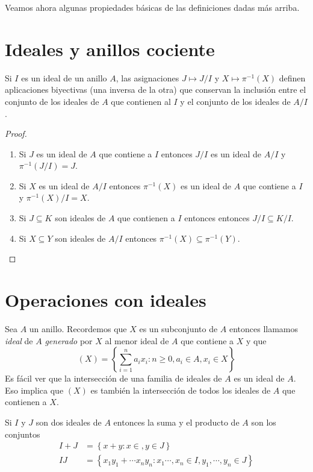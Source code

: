 Veamos ahora algunas propiedades básicas de las definiciones dadas más arriba.


\section{Ideales y anillos cociente}

\begin{teo}\label{anillos:teo:1} Si $I$ es un ideal de un anillo $A$, las asignaciones $J\mapsto J/I$ y $X\mapsto\pi^{-1}(X)$ definen aplicaciones biyectivas (una inversa de la otra) que conservan la inclusión entre el conjunto de los ideales de $A$ que contienen al $I$ y el conjunto de los ideales de $A/I$.
\end{teo}

\begin{proof} \
    \begin{enumerate}[label=(\arabic*)]
        \item Si $J$ es un ideal de $A$ que contiene a $I$ entonces $J/I$ es un ideal de $A/I$ y $\pi^{-1}(J/I)=J$.
        \item Si $X$ es un ideal de $A/I$ entonces $\pi^{-1}(X)$ es un ideal de $A$ que contiene a $I$ y $\pi^{-1}(X)/I=X$.
        \item Si $J\subseteq K$ son ideales de $A$ que contienen a $I$ entonces entonces $J/I\subseteq K/I$.
        \item Si $X\subseteq Y$ son ideales de $A/I$ entonces $\pi^{-1}(X)\subseteq\pi^{-1}(Y)$.
    \end{enumerate}
\end{proof}

\section{Operaciones con ideales}

Sea $A$ un anillo. Recordemos que $X$ es un subconjunto de $A$ entonces llamamos {\it ideal} de $A$ {\it generado} por $X$ al menor ideal de $A$ que contiene a $X$ y que 
$$(X) =\left\lbrace \sum_{i=1}^na_ix_i : n\geq 0, a_i\in A, x_i\in X \right\rbrace$$
Es fácil ver que la intersección de una familia de ideales de $A$ es un ideal de $A$. Eso implica que $(X)$ es también la intersección de todos los ideales de $A$ que contienen a $X$.

Si $I$ y $J$ son dos ideales de $A$ entonces la suma y el producto de $A$ son los conjuntos
\begin{equation*}
    \begin{split}
        I + J &= \left\lbrace x+y : x\in, y\in J \right\rbrace \\
        IJ    &= \left\lbrace x_1y_1 + \cdots x_ny_n : x_1\cdots,x_n\in I, y_1,\cdots,y_n\in J \right\rbrace
    \end{split}
\end{equation*}

